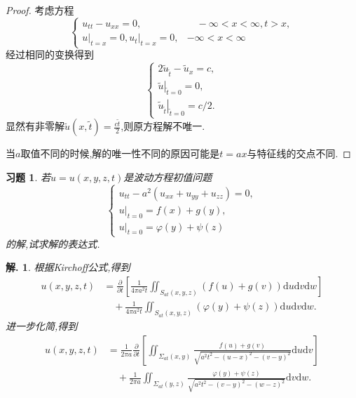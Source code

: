 \documentclass[a4paper,oneside,12pt]{ctexart}
\theoremstyle{plain}
\newtheorem{exercise}{习题}
\theoremstyle{nonumberplain}
\newtheorem{solution}{解.}
\theoremstyle{nonumberplain}
\newtheorem{proof}{证明.}
\newcommand{\dif}{\mathrm{d}}
\newcommand{\ptl}{\partial}
\renewcommand{\phi}{\varphi}
\newcommand{\cond}[2]{\left. #1\right|_{#2}}
\begin{document}
\begin{proof}
        考虑方程 
        \begin{equation*}
            \begin{cases}
                u_{tt}-u_{xx}=0,&\quad -\infty<x<\infty,t>x,\\
                \cond{u}{t=x}=0,\cond{u_t}{t=x}=0,&-\infty<x<\infty
            \end{cases}
        \end{equation*}
        经过相同的变换得到 
        \begin{equation*}
            \begin{cases}
                2\tilde{u}_{\tilde{t}}-\tilde{u}_x=c,\\
                \cond{\tilde{u}}{\tilde{t}=0}=0,\\
                \cond{\tilde{u}_{\tilde{t}}}{\tilde{t}=0}=c/2.
            \end{cases}
        \end{equation*}
        显然有非零解$\tilde{u}(x,\tilde{t})=\frac{c\tilde{t}}{2}$,则原方程解不唯一.

        当$a$取值不同的时候,解的唯一性不同的原因可能是$t=ax$与特征线的交点不同.
    \end{proof}

    \begin{exercise}
        \label{ex:8}
        若$u=u(x,y,z,t)$是波动方程初值问题 
        \begin{equation*}
            \begin{cases}
                u_{tt}-a^2(u_{xx}+u_{yy}+u_{zz})=0,\\
                \cond{u}{t=0}=f(x)+g(y),\\
                \cond{u}{t=0}=\phi(y)+\psi(z)
            \end{cases}
        \end{equation*}
        的解,试求解的表达式.
    \end{exercise}

    \begin{solution}
        根据Kirchoff公式,得到 
        \begin{align*}
            u(x,y,z,t)&=\frac{\ptl}{\ptl t}\left[\frac{1}{4\pi a^2t}\iint_{S_{at}(x,y,z)}(f(u)+g(v))\dif u\dif v\dif w\right]\\
            &\quad +\frac{1}{4\pi a^2t}\iint_{S_{at}(x,y,z)}(\phi(y)+\psi(z))\dif u\dif v\dif w.
        \end{align*}
        进一步化简,得到 
        \begin{align*}
            u(x,y,z,t)&=\frac{1}{2\pi a}\frac{\ptl }{\ptl t}\left[\iint_{\Sigma_{at}(x,y)}\frac{f(u)+g(v)}{\sqrt{a^2t^2-(u-x)^2-(v-y)^2}}\dif u\dif v\right]\\
            &\quad +\frac{1}{2\pi a}\iint_{\Sigma_{at}(y,z)}\frac{\phi(y)+\psi(z)}{\sqrt{a^2t^2-(v-y)^2-(w-z)^2}}\dif v\dif w.
        \end{align*}
    \end{solution}
\end{document}
